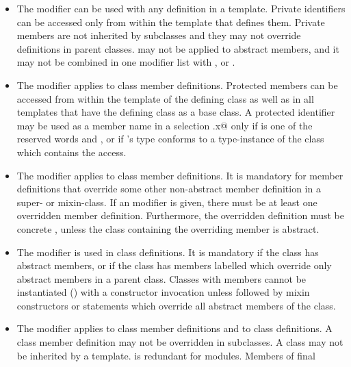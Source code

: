 \documentclass[11pt]{report}
\begin{document}
\begin{itemize}
\item
The \verb@private@ modifier can be used with any definition in a
template. Private identifiers can be accessed only from within the template
that defines them.  
Private members are not inherited by subclasses and they
may not override definitions in parent classes.
\verb@private@ may not be applied to abstract members, and it
may not be combined in one modifier list with
\verb@protected@, \verb@final@ or \verb@override@.
\item
The \verb@protected@ modifier applies to class member definitions.
Protected members can be accessed from within the template of the defining
class as well as in all templates that have the defining class as a base class.
A protected identifier \verb@x@ may be used as
a member name in a selection \verb@r.x@ only if \verb@r@ is one of the reserved
words \verb@this@ and
\verb@super@, or if \verb@r@'s type conforms to a type-instance of the class
which contains the access.
\item
The \verb@override@ modifier applies to class member definitions.  It
is mandatory for member definitions that override some other
non-abstract member definition in a super- or mixin-class. If an
\verb@override@ modifier is given, there must be at least one
overridden member definition.  Furthermore, the overridden definition
must be concrete , unless the class containing the
overriding member is abstract.
\item
The \verb@abstract@ modifier is used in class definitions. It is
mandatory if the class has abstract members, or if the class has
members labelled \verb@override@ which override only abstract members
in a parent class.  Classes with \verb@abstract@ members
cannot be instantiated () with a constructor
invocation unless followed by mixin constructors or statements which
override all abstract members of the class.
\item
The \verb@final@ modifier applies to class member definitions and to
class definitions. A \verb@final@ class member definition may not be
overridden in subclasses. A \verb@final@ class may not be inherited by
a template. \verb@final@ is redundant for modules.  Members of final

\end{itemize}
\end{document}
